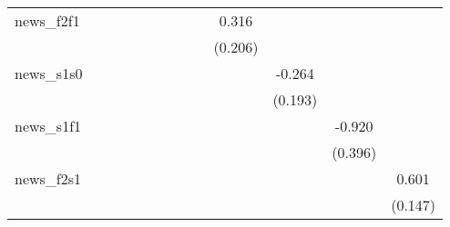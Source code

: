 {\begin{tabular}{l*{12}{c}}
\addlinespace
news\_f2f1   &                     &                     &                     &                     &                     &                     &                     &                     &       0.316         &                     &                     &                     \\
            &                     &                     &                     &                     &                     &                     &                     &                     &     (0.206)         &                     &                     &                     \\
\addlinespace
news\_s1s0   &                     &                     &                     &                     &                     &                     &                     &                     &                     &      -0.264         &                     &                     \\
            &                     &                     &                     &                     &                     &                     &                     &                     &                     &     (0.193)         &                     &                     \\
\addlinespace
news\_s1f1   &                     &                     &                     &                     &                     &                     &                     &                     &                     &                     &      -0.920\sym{**} &                     \\
            &                     &                     &                     &                     &                     &                     &                     &                     &                     &                     &     (0.396)         &                     \\
\addlinespace
news\_f2s1   &                     &                     &                     &                     &                     &                     &                     &                     &                     &                     &                     &       0.601\sym{***}\\
            &                     &                     &                     &                     &                     &                     &                     &                     &                     &                     &                     &     (0.147)         \\

\end{tabular}}
